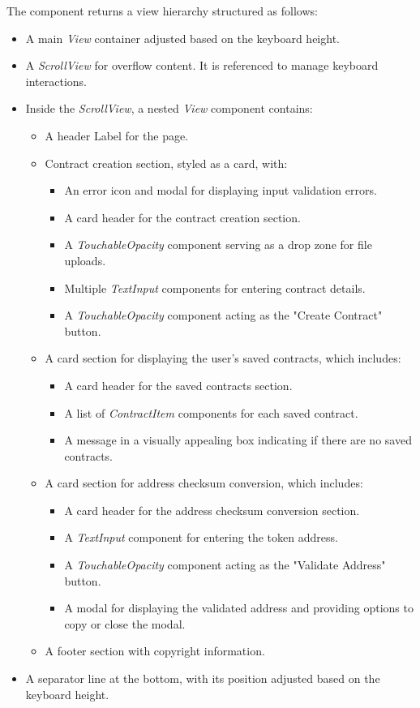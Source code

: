 The component returns a view hierarchy structured as follows:

\begin{itemize}
    \item A main \textit{View} container adjusted based on the keyboard height.
    \item A \textit{ScrollView} for overflow content. It is referenced to manage keyboard interactions.
    \item Inside the \textit{ScrollView}, a nested \textit{View} component contains:
    \begin{itemize}
        \item A header Label for the page.
        \item Contract creation section, styled as a card, with:
        \begin{itemize}
            \item An error icon and modal for displaying input validation errors.
            \item A card header for the contract creation section.
            \item A \textit{TouchableOpacity} component serving as a drop zone for file uploads.
            \item Multiple \textit{TextInput} components for entering contract details.
            \item A \textit{TouchableOpacity} component acting as the "Create Contract" button.
        \end{itemize}
        \item A card section for displaying the user's saved contracts, which includes:
        \begin{itemize}
            \item A card header for the saved contracts section.
            \item A list of \textit{ContractItem} components for each saved contract.
            \item A message in a visually appealing box indicating if there are no saved contracts.
        \end{itemize}
        \item A card section for address checksum conversion, which includes:
        \begin{itemize}
            \item A card header for the address checksum conversion section.
            \item A \textit{TextInput} component for entering the token address.
            \item A \textit{TouchableOpacity} component acting as the "Validate Address" button.
            \item A modal for displaying the validated address and providing options to copy or close the modal.
        \end{itemize}
        \item A footer section with copyright information.
    \end{itemize}
    \item A separator line at the bottom, with its position adjusted based on the keyboard height.
\end{itemize}

